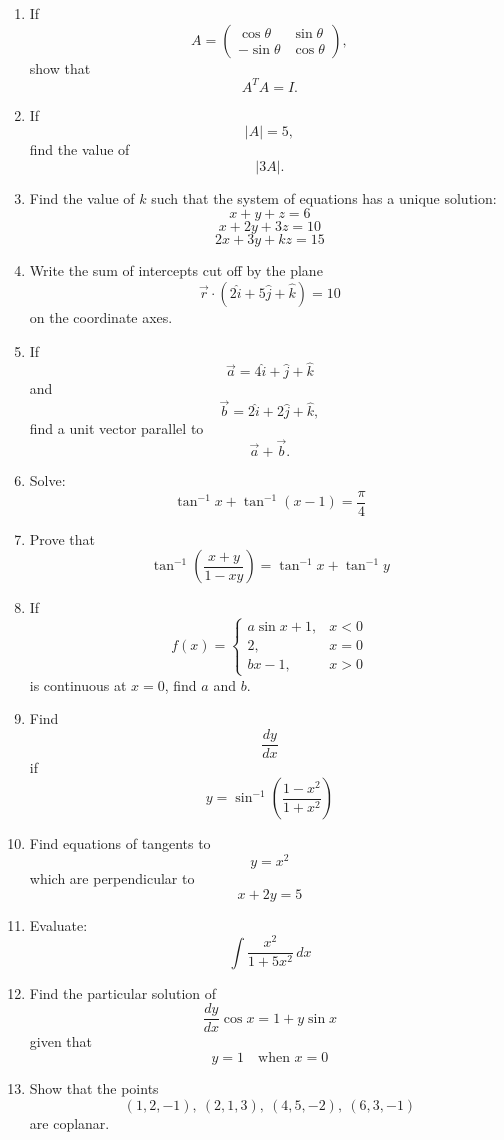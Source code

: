 \documentclass[12pt,a4paper]{article}
\begin{document}
\begin{enumerate}[label=\textbf{Q\arabic*.}]

\item If
\[
A=
\begin{pmatrix}
\cos\theta & \sin\theta\\
-\sin\theta & \cos\theta
\end{pmatrix},
\]
show that
\[
A^TA=I.
\]

\item If
\[
|A|=5,
\]
find the value of
\[
|3A|.
\]

\item Find the value of $k$ such that the system of equations has a unique solution:
\[
x+y+z=6
\]
\[
x+2y+3z=10
\]
\[
2x+3y+kz=15
\]

\item Write the sum of intercepts cut off by the plane
\[
\vec r \cdot (2\hat i+5\hat j+\hat k)=10
\]
on the coordinate axes.

\item If
\[
\vec a = 4\hat i+\hat j+\hat k
\]
and
\[
\vec b = 2\hat i+2\hat j+\hat k,
\]
find a unit vector parallel to
\[
\vec a+\vec b.
\]

\item Solve:
\[
\tan^{-1}x+\tan^{-1}(x-1)=\frac{\pi}{4}
\]

\item Prove that
\[
\tan^{-1}\left(\frac{x+y}{1-xy}\right)
=
\tan^{-1}x+\tan^{-1}y
\]

\item If
\[
f(x)=
\begin{cases}
a\sin x+1, & x<0\\
2, & x=0\\
bx-1, & x>0
\end{cases}
\]
is continuous at $x=0$, find $a$ and $b$.

\item Find
\[
\frac{dy}{dx}
\]
if
\[
y=\sin^{-1}\left(\frac{1-x^2}{1+x^2}\right)
\]

\item Find equations of tangents to
\[
y=x^2
\]
which are perpendicular to
\[
x+2y=5
\]

\item Evaluate:
\[
\int \frac{x^2}{1+5x^2}\,dx
\]

\item Find the particular solution of
\[
\frac{dy}{dx}\cos x = 1+y\sin x
\]
given that
\[
y=1 \quad \text{when } x=0
\]

\item Show that the points
\[
(1,2,-1),\ (2,1,3),\ (4,5,-2),\ (6,3,-1)
\]
are coplanar.


\end{enumerate}
\end{document}
